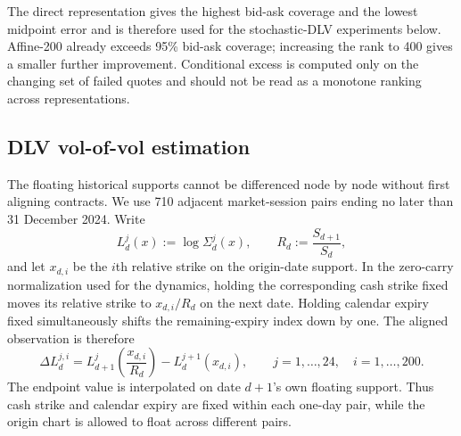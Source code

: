 \documentclass[smallextended,envcountsame,envcountsect]{svjour3}
\begin{document}
\begin{table}[H]
\centering
\small
{}
\caption{End-to-end fit to the retained market bid-ask intervals. State
dimension is 5,000 for the unrestricted daily state and the latent rank for an
affine state.}
\label{tab:numerics-static-market-fit}
\end{table}

The direct representation gives the highest bid-ask coverage and the lowest
midpoint error and is therefore used for the stochastic-DLV experiments below.
Affine-200 already exceeds 95\% bid-ask coverage; increasing the rank to 400
gives a smaller further improvement. Conditional excess is computed only on
the changing set of failed quotes and should not be read as a monotone ranking
across representations.

\subsection{DLV vol-of-vol estimation}
\label{sec:estimation-vol-of-vol}

The floating historical supports cannot be differenced node by node without
first aligning contracts.  We use 710 adjacent market-session pairs ending no
later than 31 December 2024.  Write
\[
  L_d^j(x):=\log\Sigma_d^j(x),
  \qquad R_d:=\frac{S_{d+1}}{S_d},
\]
and let $x_{d,i}$ be the $i$th relative strike on the origin-date support.  In
the zero-carry normalization used for the dynamics, holding the corresponding
cash strike fixed moves its relative strike to $x_{d,i}/R_d$ on the next date.
Holding calendar expiry fixed simultaneously shifts the remaining-expiry index
down by one.  The aligned observation is therefore
\begin{equation}
  \label{eq:estimation-fixed-contract-increment}
  \Delta L_d^{j,i}
  =L_{d+1}^{j}\!\left(\frac{x_{d,i}}{R_d}\right)
   -L_d^{j+1}(x_{d,i}),
  \qquad j=1,\ldots,24,\quad i=1,\ldots,200.
\end{equation}
The endpoint value is interpolated on date $d+1$'s own floating support.  Thus
cash strike and calendar expiry are fixed within each one-day pair, while the
origin chart is allowed to float across different pairs.
\end{document}
